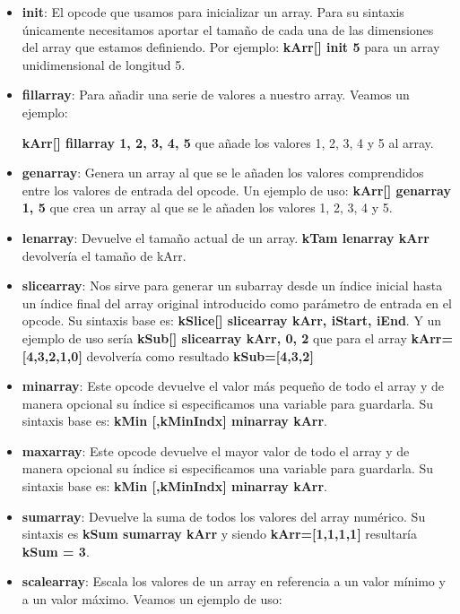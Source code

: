 \begin{itemize}
 \item \textbf{init}: El opcode que usamos para inicializar un array. Para su sintaxis únicamente necesitamos aportar el tamaño de cada una de las dimensiones del array que estamos definiendo. Por ejemplo: \textbf{kArr[]   init 5} para un array unidimensional de longitud 5.
 \item \textbf{fillarray}: Para añadir una serie de valores a nuestro array. Veamos un ejemplo:
 
 \textbf{kArr[] fillarray 1, 2, 3, 4, 5} que añade los valores 1, 2, 3, 4 y 5 al array.
 \item \textbf{genarray}: Genera un array al que se le añaden los valores comprendidos entre los valores de entrada del opcode. Un ejemplo de uso: \textbf{kArr[] genarray   1, 5} que crea un array al que se le añaden los valores 1, 2, 3, 4 y 5.
 \item \textbf{lenarray}: Devuelve el tamaño actual de un array. \textbf{kTam  lenarray  kArr} devolvería el tamaño de kArr. 
 \item \textbf{slicearray}: Nos sirve para generar un subarray desde un índice inicial hasta un índice final del array original introducido como parámetro de entrada en el opcode. Su sintaxis base es: \textbf{kSlice[] slicearray kArr, iStart, iEnd}. Y un ejemplo de uso sería \textbf{kSub[]  slicearray kArr, 0, 2} que para el array \textbf{kArr=[4,3,2,1,0]} devolvería como resultado \textbf{kSub=[4,3,2]}
 \item \textbf{minarray}: Este opcode devuelve el valor más pequeño de todo el array y de manera opcional su índice si especificamos una variable para guardarla. Su sintaxis base  es: \textbf{kMin [,kMinIndx] minarray kArr}.
 \item \textbf{maxarray}: Este opcode devuelve el mayor valor de todo el array y de manera opcional su índice si especificamos una variable para guardarla. Su sintaxis base  es: \textbf{kMin [,kMinIndx] minarray kArr}.
 \item \textbf{sumarray}: Devuelve la suma de todos los valores del array numérico. Su sintaxis es \textbf{kSum sumarray kArr} y siendo \textbf{kArr=[1,1,1,1]} resultaría \textbf{kSum = 3}.
 \item \textbf{scalearray}: Escala los valores de un array en referencia a un valor mínimo y a un valor máximo. Veamos un ejemplo de uso: 
  


\end{itemize}

